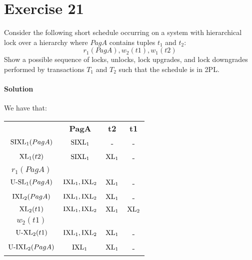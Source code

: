 \section{Exercise 21}

Consider the following short schedule occurring on a system with hierarchical lock over a hierarchy where $PagA$ contains tuples $t_1$ and $t_2$:
\[r_1( PagA ), w_2( t1 ), w_1( t2 )\]
Show a possible sequence of locks, unlocks, lock upgrades, and lock downgrades performed by transactions $T_1$ and $T_2$ such that the schedule is in 2PL.

\paragraph*{Solution}
We have that: 
\begin{table}[H]
    \centering
    \begin{tabular}{c|ccc|}
    \cline{2-4}
    \textit{}                    & \textbf{PagA}                           & \textbf{t2}          & \textbf{t1}           \\ \cline{2-4} 
    $\textnormal{SIXL}_1(PagA)$  & $\textnormal{SIXL}_1$                   & -                    & -                     \\
    $\textnormal{XL}_1(t2)$      & $\textnormal{SIXL}_1$                   & $\textnormal{XL}_1$  & -                     \\
    $r_1(PagA)$                  &                                         &                      &                       \\
    $\textnormal{U-SL}_1(PagA)$  & $\textnormal{IXL}_1,\textnormal{IXL}_2$ & $\textnormal{XL}_1$  & -                     \\
    $\textnormal{IXL}_2(PagA)$   & $\textnormal{IXL}_1,\textnormal{IXL}_2$ & $\textnormal{XL}_1$  & -                     \\
    $\textnormal{XL}_2(t1)$      & $\textnormal{IXL}_1,\textnormal{IXL}_2$ & $\textnormal{XL}_1$  & $\textnormal{XL}_2$   \\
    $w_2(t1)$                    &                                         &                      &                       \\
    $\textnormal{U-XL}_2(t1)$    & $\textnormal{IXL}_1,\textnormal{IXL}_2$ & $\textnormal{XL}_1$  & -                     \\
    $\textnormal{U-IXL}_2(PagA)$ & $\textnormal{IXL}_1$                    & $\textnormal{XL}_1$  & -                     \\

\end{tabular}
\end{table}
